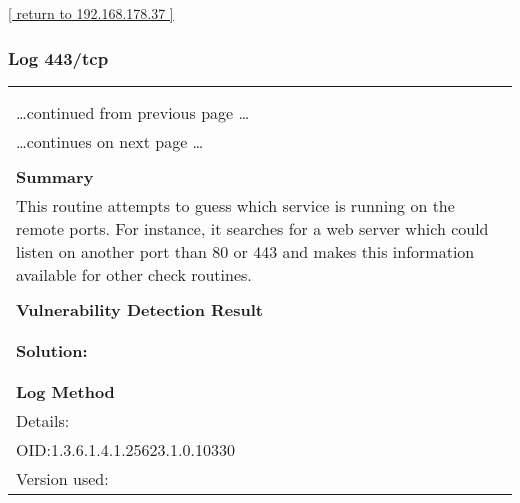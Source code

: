 \documentclass{article}
\begin{document}
\begin{footnotesize}\hyperref[host:192.168.178.37]{[ return to 192.168.178.37 ]}\end{footnotesize}
\subsubsection{Log 443/tcp}
\label{port:192.168.178.37 443/tcp Log}

\begin{longtable}{|p{}|}
\hline
\rowcolor{gvm_log}{\color{white}{Log (CVSS: 0.0) }}\\
\rowcolor{gvm_log}{\color{white}{NVT: Services}}\\
\hline
\endfirsthead
\hfill\ldots continued from previous page \ldots \\
\hline
\endhead
\hline
\ldots continues on next page \ldots \\
\endfoot
\hline
\endlastfoot
\\
\textbf{Summary}\\
This routine attempts to guess which service is running on the
  remote ports. For instance, it searches for a web server which could listen on another port than
  80 or 443 and makes this information available for other check routines.\\

        \hline
        \\
\textbf{Vulnerability Detection Result}\\
\rowcolor{white}{\verb=A TLScustom server answered on this port=}\\

          \hline
          \\
\textbf{Solution:}\\
\\


        \hline
        \\
\textbf{Log Method}\\
Details:
\rowcolor{white}{\verb=Services=}\\
OID:1.3.6.1.4.1.25623.1.0.10330\\
Version used:
\rowcolor{white}{\verb=2021-03-15T10:42:03Z=}\\
\end{longtable}
\end{document}

